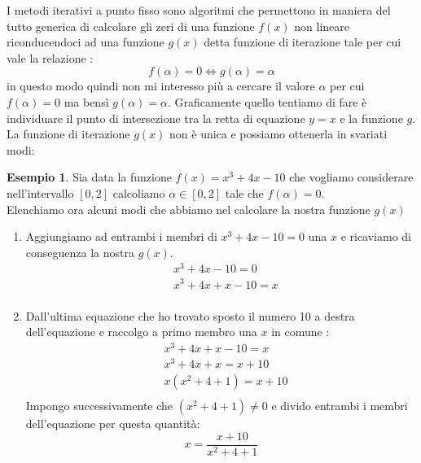 \documentclass[12pt, a4paper]{book}
\theoremstyle{definition}
\newtheorem{exmp}{Esempio}[section]
\begin{document}
\begin{flushleft}
I metodi iterativi a punto fisso sono algoritmi che permettono in maniera del tutto generica di calcolare gli zeri di una funzione $f(x)$ non lineare riconducendoci ad una funzione $g(x)$ detta funzione di iterazione tale per cui vale la relazione : 
\[ 
	f(\alpha) = 0 \Longleftrightarrow g(\alpha) = \alpha
\]
in questo modo quindi non mi interesso più a cercare il valore $\alpha$ per cui $f(\alpha) = 0$ ma bensì $g(\alpha) = \alpha$.
Graficamente quello tentiamo di fare è individuare il punto di intersezione tra la retta di equazione $y = x$ e la funzione $g$.
La funzione di iterazione $g(x)$ non è unica e possiamo ottenerla in svariati modi:
\begin{exmp}
Sia data la funzione $f(x) = x^{3} + 4x - 10$ che vogliamo considerare nell'intervallo $[0,2]$ calcoliamo $\alpha \in [0,2]$ tale che $f(\alpha) = 0$.\\
\vspace{1em}
Elenchiamo ora alcuni modi che abbiamo nel calcolare la nostra funzione $g(x)$
\begin{enumerate}
	\item Aggiungiamo ad entrambi i membri di $x^{3} + 4x - 10=0$ una $x$ e ricaviamo di conseguenza la nostra $g(x)$.
			\begin{equation}
				\begin{split}
					& x^{3} + 4x - 10=0 \\
					& x^{3} + 4x + x - 10 = x \\
				\end{split}
			\end{equation}
	\item Dall'ultima equazione che  ho trovato sposto il numero 10 a destra dell'equazione e raccolgo a primo membro una $x$ in comune :
		\begin{equation}
				\begin{split}
					& x^{3} + 4x + x - 10 = x \\
					& x^{3} + 4x + x = x + 10 \\
					& x(x^{2} + 4 + 1) = x + 10 \\
				\end{split}
		\end{equation}
	Impongo successivamente che $(x^{2} + 4 + 1) \neq 0 $ e divido entrambi i membri dell'equazione per questa quantità:
	\[ 
		x = \dfrac{x + 10}{x^{2} + 4 + 1}	
	\]
\end{enumerate}
\end{exmp}


\end{flushleft}
\end{document}
